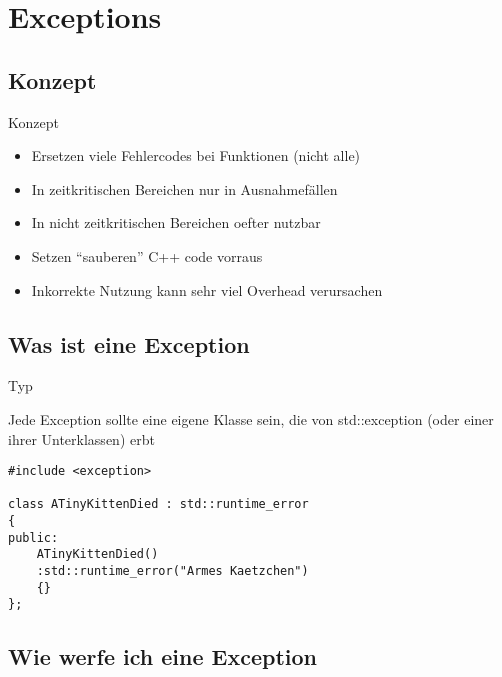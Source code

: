 \section{Exceptions}


\subsection{Konzept}

\begin{frame}{Konzept}
	\begin{itemize}
		\item Ersetzen viele Fehlercodes bei Funktionen (nicht alle)
		\item In zeitkritischen Bereichen nur in Ausnahmefällen
		\item In nicht zeitkritischen Bereichen oefter nutzbar
		\item Setzen \enquote{sauberen} C++ code vorraus
		\item Inkorrekte Nutzung kann sehr viel Overhead verursachen
	\end{itemize}
\end{frame}

\subsection{Was ist eine Exception}

\begin{frame}[fragile]{Typ}

Jede Exception sollte eine eigene Klasse sein, die von std::exception (oder einer ihrer Unterklassen) erbt

	\begin{lstlisting}[]
#include <exception>

class ATinyKittenDied : std::runtime_error
{
public:
    ATinyKittenDied()
    :std::runtime_error("Armes Kaetzchen")
    {}
};
	\end{lstlisting}
\end{frame}

\subsection{Wie werfe ich eine Exception}


